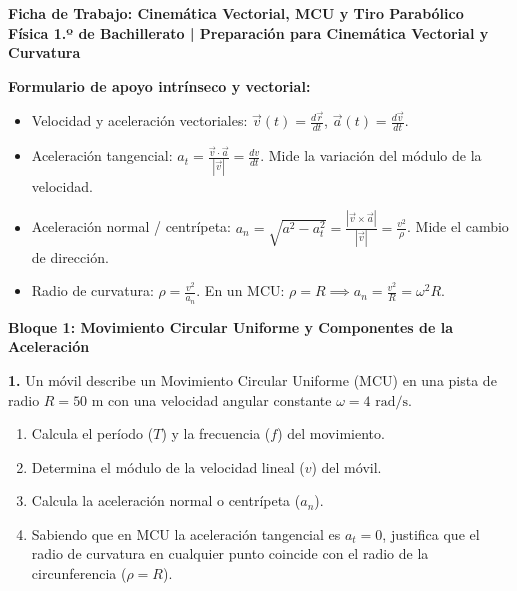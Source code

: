 \documentclass[11pt,a4paper]{article}
\begin{document}
\pagestyle{empty}

\begin{center}
    {\LARGE \textbf{Ficha de Trabajo: Cinemática Vectorial, MCU y Tiro Parabólico}}\\[4pt]
    {\large \textbf{Física 1.º de Bachillerato | Preparación para Cinemática Vectorial y Curvatura}}
\end{center}

\vspace{0.3cm}
\begin{tcolorbox}
\textbf{Formulario de apoyo intrínseco y vectorial:}
\begin{itemize}[leftmargin=1.5em, itemsep=2pt]
    \item Velocidad y aceleración vectoriales: $\vec{v}(t) = \frac{d\vec{r}}{dt}$, \quad $\vec{a}(t) = \frac{d\vec{v}}{dt}$.
    \item Aceleración tangencial: $a_t = \frac{\vec{v} \cdot \vec{a}}{|\vec{v}|} = \frac{dv}{dt}$. \quad Mide la variación del módulo de la velocidad.
    \item Aceleración normal / centrípeta: $a_n = \sqrt{a^2 - a_t^2} = \frac{|\vec{v} \times \vec{a}|}{|\vec{v}|} = \frac{v^2}{\rho}$. \quad Mide el cambio de dirección.
    \item Radio de curvatura: $\rho = \frac{v^2}{a_n}$. \quad En un MCU: $\rho = R \implies a_n = \frac{v^2}{R} = \omega^2 R$.
\end{itemize}
\end{tcolorbox}

\vspace{0.4cm}
\noindent\textbf{Bloque 1: Movimiento Circular Uniforme y Componentes de la Aceleración}

\vspace{0.2cm}
\noindent\textbf{1.} Un móvil describe un Movimiento Circular Uniforme (MCU) en una pista de radio $R = 50\text{ m}$ con una velocidad angular constante $\omega = 4\text{ rad/s}$.
\begin{enumerate}[label=\textbf{\alph*)}, leftmargin=2em, itemsep=6pt]
    \item Calcula el período ($T$) y la frecuencia ($f$) del movimiento.
    \item Determina el módulo de la velocidad lineal ($v$) del móvil.
    \item Calcula la aceleración normal o centrípeta ($a_n$).
    \item Sabiendo que en MCU la aceleración tangencial es $a_t = 0$, justifica que el radio de curvatura en cualquier punto coincide con el radio de la circunferencia ($\rho = R$).
\end{enumerate}
\end{document}

